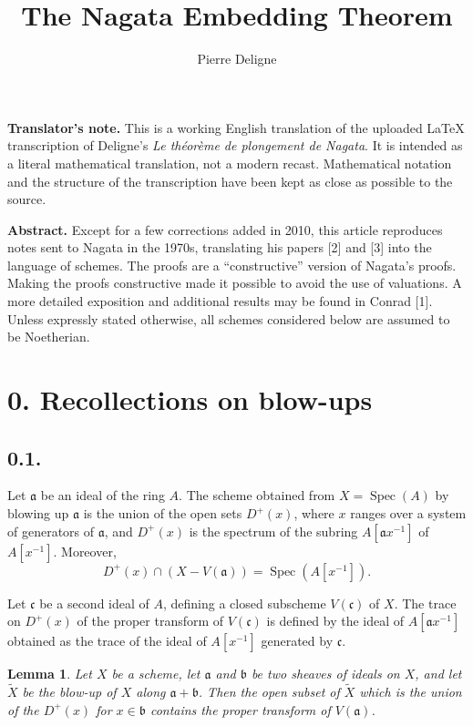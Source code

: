 \documentclass[11pt,a4paper]{article}
\title{\textbf{The Nagata Embedding Theorem}}
\author{Pierre Deligne}
\date{}
\theoremstyle{plain}
\newtheorem{lemma}[theorem]{Lemma}
\theoremstyle{definition}
\DeclareMathOperator{\Spec}{Spec}
\begin{document}
\maketitle

\noindent\textbf{Translator's note.} This is a working English translation of the uploaded LaTeX transcription of Deligne's \emph{Le th\'eor\`eme de plongement de Nagata}. It is intended as a literal mathematical translation, not a modern recast. Mathematical notation and the structure of the transcription have been kept as close as possible to the source.

\bigskip
\noindent\textbf{Abstract.} Except for a few corrections added in 2010, this article reproduces notes sent to Nagata in the 1970s, translating his papers [2] and [3] into the language of schemes. The proofs are a ``constructive'' version of Nagata's proofs. Making the proofs constructive made it possible to avoid the use of valuations. A more detailed exposition and additional results may be found in Conrad [1]. Unless expressly stated otherwise, all schemes considered below are assumed to be Noetherian.

\section*{0. Recollections on blow-ups}

\subsection*{0.1.}

Let $\mathfrak{a}$ be an ideal of the ring $A$. The scheme obtained from $X=\Spec(A)$ by blowing up $\mathfrak{a}$ is the union of the open sets $D^+(x)$, where $x$ ranges over a system of generators of $\mathfrak{a}$, and $D^+(x)$ is the spectrum of the subring $A[\mathfrak{a}x^{-1}]$ of $A[x^{-1}]$. Moreover,
\[
D^+(x)\cap (X-V(\mathfrak{a}))=\Spec(A[x^{-1}]).
\]

Let $\mathfrak{c}$ be a second ideal of $A$, defining a closed subscheme $V(\mathfrak{c})$ of $X$. The trace on $D^+(x)$ of the proper transform of $V(\mathfrak{c})$ is defined by the ideal of $A[\mathfrak{a}x^{-1}]$ obtained as the trace of the ideal of $A[x^{-1}]$ generated by $\mathfrak{c}$.

\begin{lemma}
Let $X$ be a scheme, let $\mathfrak{a}$ and $\mathfrak{b}$ be two sheaves of ideals on $X$, and let $\widetilde{X}$ be the blow-up of $X$ along $\mathfrak{a}+\mathfrak{b}$. Then the open subset of $\widetilde{X}$ which is the union of the $D^+(x)$ for $x\in\mathfrak{b}$ contains the proper transform of $V(\mathfrak{a})$.
\end{lemma}
\end{document}
